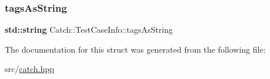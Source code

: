 \subsubsection{\texorpdfstring{tags\+As\+String}{tagsAsString}}
{\footnotesize\ttfamily \textbf{ std\+::string} Catch\+::\+Test\+Case\+Info\+::tags\+As\+String}



The documentation for this struct was generated from the following file\+:\begin{DoxyCompactItemize}
\item 
src/\hyperlink{catch_8hpp}{catch.\+hpp}\end{DoxyCompactItemize}
